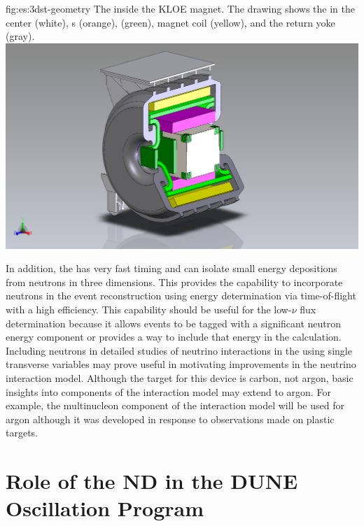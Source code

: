 \begin{dunefigure}{fig:es:3dst-geometry}
{The  inside the KLOE magnet. The drawing shows the  in the center (white), s (orange),  (green), magnet coil (yellow), and the return yoke (gray).}
  \includegraphics[width=7.in]{graphics/3DST-KLOE2019-08-01.png}
\end{dunefigure}




In addition, the  has very fast timing and can isolate small energy depositions from neutrons in three dimensions.  This provides the capability to  incorporate neutrons in the event reconstruction using energy determination via time-of-flight with a high efficiency. This capability should be useful for the low-$\nu$ flux determination because it allows events to be tagged with a significant neutron energy component or provides a way to include that energy in the calculation.  Including neutrons in detailed studies of neutrino interactions in the  using single transverse variables may prove useful in motivating improvements in the neutrino interaction model. Although the target for this device is carbon, not argon, basic insights into components of the interaction model may extend to argon.  For example, the multinucleon component of the interaction model will be used for argon although it was developed in response to observations made on plastic targets.   



\section{Role of the ND in the DUNE Oscillation Program}
\label{sec:exsum-nd-role}

